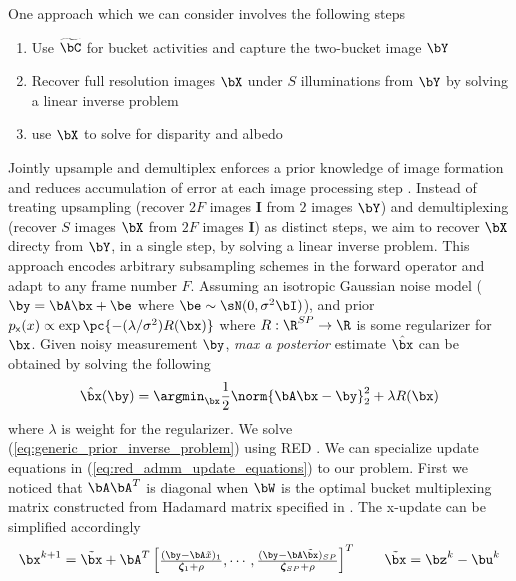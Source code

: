\documentclass[11pt]{article}
\renewcommand{\sI}{\boldsymbol{I}}
\newcommand\rx{\ensuremath{\mathsf{x}}}
\newcommand\bzeta{\ensuremath{\boldsymbol{\zeta}}}
\begin{document}
One approach which we can consider involves the following steps
\begin{enumerate}
    \item Use $\widetilde{\bC}$ for bucket activities and capture the two-bucket image $\bY$
    \item Recover full resolution images $\bX$ under $S$ illuminations from $\bY$ by solving a linear inverse problem
    \item use $\bX$ to solve for disparity and albedo
\end{enumerate}
Jointly upsample and demultiplex enforces a prior knowledge of image formation and reduces accumulation of error at each image processing step \cite{heideFlexISPFlexibleCamera2014}. Instead of treating upsampling (recover $2F$ images $\sI$ from $2$ images $\bY$) and demultiplexing (recover $S$ images $\bX$ from $2F$ images $\sI$) as distinct steps, we aim to recover $\bX$ directy from $\bY$, in a single step, by solving a linear inverse problem. This approach encodes arbitrary subsampling schemes in the forward operator and adapt to any frame number $F$. Assuming an isotropic Gaussian noise model ($\by=\bA\bx + \be$ where $\be\sim \sN(0,\sigma^2 \bI)$), and prior $p_{\rx}(x) \propto \exp\pc{- (\lambda/\sigma^2) R(\bx) }$ where $R:\R^{SP}\to\R$ is some regularizer for $\bx$. Given noisy measurement $\by$, \textit{max a posterior} estimate $\hat{\bx}$ can be obtained by solving the following
\begin{align}
    \hat{\bx}(\by)
        = \argmin_{\bx}
        \frac{1}{2} \norm{\bA\bx-\by}_2^2 + \lambda R(\bx)
    \label{eq:generic_prior_inverse_problem}
\end{align}
where $\lambda$ is weight for the regularizer. We solve (\ref{eq:generic_prior_inverse_problem}) using RED \cite{romanoLittleEngineThat2016}. We can specialize update equations in (\ref{eq:red_admm_update_equations}) to our problem. First we noticed that $\bA\bA^T$ is diagonal when $\bW$ is the optimal bucket multiplexing matrix constructed from Hadamard matrix specified in \cite{weiCodedTwoBucketCameras2018}. The x-update can be simplified accordingly \cite{liuRankMinimizationSnapshot2019}
\begin{align}
    \bx^{k+1}
        = \tilde{\bx} + \bA^T \begin{bmatrix}
            \frac{(\by - \bA\tilde{x})_1}{\bzeta_1 + \rho},\cdots, \frac{(\by - \bA\tilde{\bx})_{SP}}{\bzeta_{SP} + \rho}
        \end{bmatrix}^T
        \qquad \tilde{\bx} = \bz^k - \bu^k
    \label{eq:red_x_desci_update}
\end{align}
\end{document}
